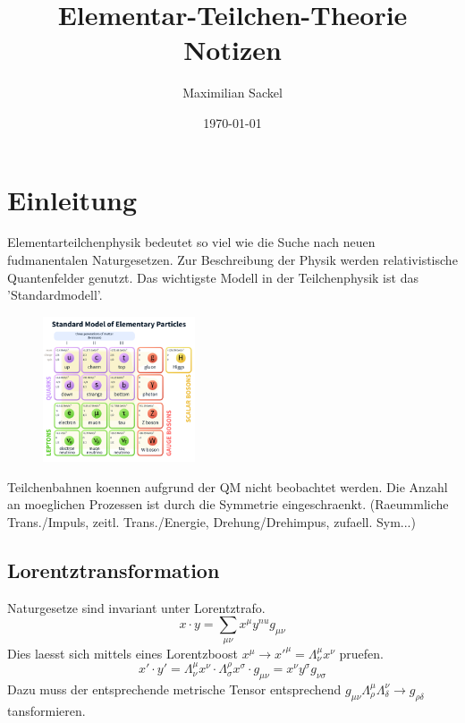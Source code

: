 \documentclass[11pt,a4paper,twocolumn]{article}
\begin{document}
\title{Elementar-Teilchen-Theorie Notizen}
\author{Maximilian Sackel}
\date{\today}
\maketitle

\section{Einleitung}
Elementarteilchenphysik bedeutet so viel wie die Suche nach neuen fudmanentalen
Naturgesetzen. 
Zur Beschreibung der Physik werden relativistische Quantenfelder genutzt.
Das wichtigste Modell in der Teilchenphysik ist das 'Standardmodell'.
\begin{figure}[h]
		\centering
		\includegraphics[width=0.4\textwidth]{./picture/Quark.png}
\end{figure}
Teilchenbahnen koennen aufgrund der QM nicht beobachtet werden. 
Die Anzahl an moeglichen Prozessen ist durch die Symmetrie eingeschraenkt.
(Raeummliche Trans./Impuls, zeitl. Trans./Energie, Drehung/Drehimpus, zufaell.
Sym...)

\subsection{Lorentztransformation}
Naturgesetze sind invariant unter Lorentztrafo.
\begin{equation}
		x \cdot y = \sum_{\mu \nu} x^{\mu} y^{nu} g_{\mu \nu}
\end{equation}
Dies laesst sich mittels eines Lorentzboost $x^{\mu} \to x'^{\mu} =
\Lambda^{\mu}_{\nu} x^{\nu} $ pruefen.
\begin{equation}
		x' \cdot y' = \Lambda^{\mu}_{\nu} x^{\nu} \cdot \Lambda^{\rho}_{\sigma}
		x^{\sigma} \cdot g_{\mu \nu} = x^{\nu} y^{\sigma} g_{\nu \sigma}
\end{equation}
Dazu muss der entsprechende metrische Tensor entsprechend $g_{\mu \nu}
\Lambda^{\mu}_{\rho} \Lambda^{\nu}_{\delta} \to g_{\rho \delta}$ tansformieren. 
\end{document}

